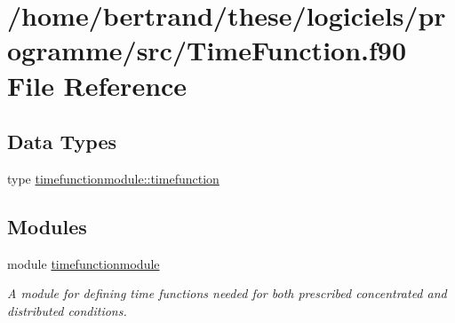 \hypertarget{_time_function_8f90}{}\section{/home/bertrand/these/logiciels/programme/src/\+Time\+Function.f90 File Reference}
\label{_time_function_8f90}
\subsection*{Data Types}
\begin{DoxyCompactItemize}
\item 
type \hyperlink{structtimefunctionmodule_1_1timefunction}{timefunctionmodule\+::timefunction}
\end{DoxyCompactItemize}
\subsection*{Modules}
\begin{DoxyCompactItemize}
\item 
module \hyperlink{namespacetimefunctionmodule}{timefunctionmodule}
\begin{DoxyCompactList}\small\item\em A module for defining time functions needed for both prescribed concentrated and distributed conditions. \end{DoxyCompactList}\end{DoxyCompactItemize}

